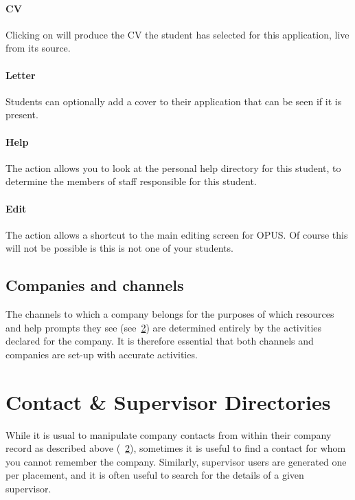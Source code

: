 \documentclass[12 pt]{book}
\begin{document}
\subsubsection{CV}

Clicking on  will produce the CV the student has selected for this
application, live from its source.

\subsubsection{Letter}

Students can optionally add a cover  to their application that
can be seen if it is present.

\subsubsection{Help}

The  action allows you to look at the personal help directory
for this student, to determine the members of staff responsible for this
student.

\subsubsection{Edit}

The  action allows a shortcut to the main editing screen for
OPUS. Of course this will not be possible is this is not one of your students.

\section{Companies and channels}

The channels to which a company belongs for the purposes of which resources
and help prompts they see (see~\ref{}) are determined entirely by the
activities declared for the company. It is therefore essential that both
channels and companies are set-up with accurate activities.

%
%
%

\chapter{Contact \& Supervisor Directories}

While it is usual to manipulate company contacts from within their company record as described above
(~\ref{}), sometimes it is useful to find a contact for whom you cannot remember the company.
Similarly, supervisor users are generated one per placement, and it is often useful to search for
the details of a given supervisor.
\end{document}
